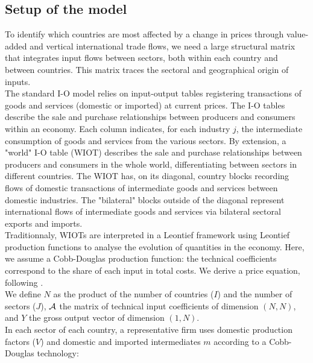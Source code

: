 \documentclass[11pt,a4paper]{paper} %
\begin{document}
\subsection{Setup of the model}\label{subsec:piwimsetup}
To identify which countries are most affected by a change in prices through value-added and vertical international trade flows, we need a large structural matrix that integrates input flows between sectors, both within each country and between countries.
This matrix traces the sectoral and geographical origin of inputs. \\
The standard I-O model relies on input-output tables registering transactions of goods and services (domestic or imported) at current prices. The I-O tables describe the sale and purchase relationships between producers and consumers within an economy. Each column indicates, for each industry $j$, the intermediate consumption of goods and services from the various sectors.
By extension, a "world" I-O table (WIOT) describes the sale and purchase relationships between producers and consumers in the whole world, differentiating between sectors in different countries.
The WIOT has, on its diagonal,  country blocks recording flows of domestic transactions of intermediate goods and services between domestic industries.
The "bilateral" blocks outside of the diagonal represent international flows of intermediate goods and services via bilateral sectoral exports and imports. \\
Traditionnaly, WIOTs are interpreted in a Leontief framework using Leontief production functions to analyse the evolution of quantities in the economy. 
Here, we assume a Cobb-Douglas production function: the technical coefficients correspond to the share of each input in total costs. 
We derive a price equation, following \cite{DeSoyres2018}.\\
We define $N$ as the product of the number of countries ($I$) and the number of sectors ($J$), $\cal A$ the matrix of technical input coefficients of dimension $(N, N)$, and $Y$ the gross output vector of dimension $(1, N)$. \\
In each sector of each country, a representative firm uses domestic production factors ($V$) and domestic and imported intermediates $m$ according to a Cobb-Douglas technology:
\end{document}
